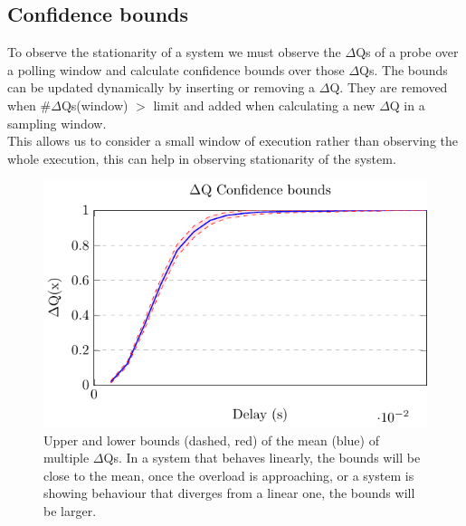 \subsection{Confidence bounds}
    To observe the stationarity of a system we must observe the $\Delta$Qs of a probe over a polling window and calculate confidence bounds over those $\Delta$Qs. The bounds can be updated dynamically by inserting or removing a $\Delta$Q. They are removed when \#$\Delta$Qs(window) $>$ limit and added when calculating a new $\Delta$Q in a sampling window. \\
    This allows us to consider a small window of execution rather than observing the whole execution, this can help in observing stationarity of the system.
        \begin{figure}[H]
            \begin{center}
                \includegraphics[scale=1]{tikz/ci.pdf} 
            \end{center}
            \caption{Upper and lower bounds (dashed, red) of the mean (blue) of multiple $\Delta$Qs. In a system that behaves linearly, the bounds will be close to the mean, once the overload is approaching, or a system is showing behaviour that diverges from a linear one, the bounds will be larger.}
        \end{figure}

  
